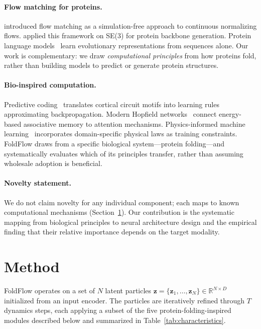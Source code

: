 \documentclass[10pt]{article}
\newcommand{\R}{\mathbb{R}}
\newcommand{\bz}{\mathbf{z}}
\begin{document}
\paragraph{Flow matching for proteins.}
\citet{lipman2023flow} introduced flow matching as a simulation-free
approach to continuous normalizing flows.  \citet{bose2024se3stochastic}
applied this framework on SE(3) for protein backbone generation.  Protein
language models~\citep{lin2023evolutionary} learn evolutionary
representations from sequences alone.  Our work is complementary: we draw
\emph{computational principles} from how proteins fold, rather than
building models to predict or generate protein structures.

\paragraph{Bio-inspired computation.}
Predictive coding~\citep{millidge2021predictive} translates cortical
circuit motifs into learning rules approximating backpropagation.
Modern Hopfield networks~\citep{ramsauer2020hopfield} connect
energy-based associative memory to attention mechanisms.
Physics-informed machine learning~\citep{karniadakis2021physics}
incorporates domain-specific physical laws as training constraints.
FoldFlow draws from a specific biological system---protein
folding---and systematically evaluates which of its principles transfer,
rather than assuming wholesale adoption is beneficial.

\paragraph{Novelty statement.}
We do not claim novelty for any individual component; each maps to known computational mechanisms (Section~\ref{sec:method}). Our contribution is the systematic mapping from biological principles to neural architecture design and the empirical finding that their relative importance depends on the target modality.

\section{Method}
\label{sec:method}

FoldFlow operates on a set of $N$ latent particles
$\bz = \{\bz_1, \ldots, \bz_N\} \in \R^{N \times D}$ initialized
from an input encoder.  The particles are iteratively refined through
$T$ dynamics steps, each applying a subset of the five
protein-folding-inspired modules described below and summarized in
Table~\ref{tab:characteristics}.
\end{document}

